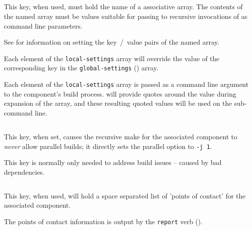 \subsection{}\label{variables:local-settings}

This key, when used, must hold the name of a \gmsl associative array.
The contents of the named array must be values suitable for passing to
recursive invocations of \make as command line parameters.

See  for information on setting the
key~/~value pairs of the named array.

Each element of the \texttt{local-settings} array will override the
value of the corresponding key in the \texttt{global-settings}
() array.

Each element of the \texttt{local-settings} array is passed as a
command line argument to the component's build process.  \lmsbw will
provide quotes around the value during expansion of the array, and
these resulting quoted values will be used on the sub-\make command
line.


\subsection{}\label{variables:no-parallel}

This key, when set, causes the recursive make for the associated
component to \emph{never} allow parallel builds; it directly sets the
\gnumake parallel option to \texttt{-j 1}.

This key is normally only needed to address build issues -- caused by
bad dependencies.


\subsection{}\label{variables:poc}

This key, when used, will hold a space separated list of 'points of
contact' for the associated component.

The points of contact information is output by the \texttt{report}
verb ().


